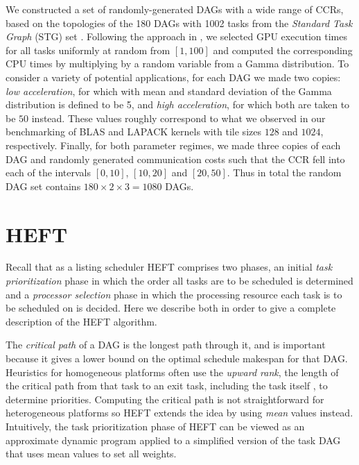 \documentclass[runningheads]{llncs}
\begin{document}
We constructed a set of randomly-generated DAGs with a wide range of CCRs, based on the topologies of the 180 DAGs with 1002 tasks from the {\em Standard Task Graph} (STG) set \cite{Tobita2002}. Following the approach in \cite{canon2018}, we selected GPU execution times for all tasks uniformly at random from $[1, 100]$ and computed the corresponding CPU times by multiplying by a random variable from a Gamma distribution. To consider a variety of potential applications, for each DAG we made two copies: {\em low acceleration}, for which with mean and standard deviation of the Gamma distribution is defined to be 5, and {\em high acceleration}, for which both are taken to be $50$ instead. These values roughly correspond to what we observed in our benchmarking of BLAS and LAPACK kernels with tile sizes $128$ and $1024$, respectively. Finally, for both parameter regimes, we made three copies of each DAG and randomly generated communication costs such that the CCR fell into each of the intervals $[0, 10]$, $[10, 20]$ and $[20, 50]$. Thus in total the random DAG set contains $180 \times 2 \times 3 = 1080$ DAGs.  



\section{HEFT}
\label{sect.HEFT}

Recall that as a listing scheduler HEFT comprises two phases, an initial {\em task prioritization} phase in which the order all tasks are to be scheduled is determined and a {\em processor selection} phase in which the processing resource each task is to be scheduled on is decided. Here we describe both in order to give a complete description of the HEFT algorithm. 

The {\em critical path} of a DAG is the longest path through it, and is important because it gives a lower bound on the optimal schedule makespan for that DAG. Heuristics for homogeneous platforms often use the {\em upward rank}, the length of the critical path from that task to an exit task, including the task itself \cite{topcuoglu2002performance}, to determine priorities. Computing the critical path is not straightforward for heterogeneous platforms so HEFT extends the idea by using {\em mean} values instead. Intuitively, the task prioritization phase of HEFT can be viewed as an approximate dynamic program applied to a simplified version of the task DAG that uses mean values to set all weights.
\end{document}
